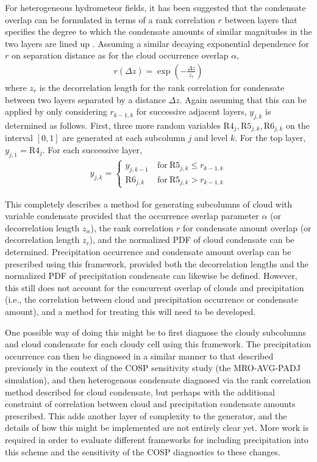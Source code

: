 \documentclass[letter]{article}
\begin{document}
For heterogeneous hydrometeor fields, it has been suggested that the condensate overlap can be formulated in terms of a rank correlation $r$ between layers that specifies the degree to which the condensate amounts of similar magnitudes in the two layers are lined up \citep[e.g.,][]{raisanen_et_al_2004,pincus_et_al_2005}. Assuming a similar decaying exponential dependence for $r$ on separation distance as for the cloud occurrence overlap $\alpha$,
\begin{gather}
    r(\Delta z) = \exp\left(-\frac{\Delta z}{z_r}\right)
    \label{r_z}
\end{gather}
where $z_r$ is the decorrelation length for the rank correlation for condensate between two layers separated by a distance $\Delta z$. Again assuming that this can be applied by only considering $r_{k-1,k}$ for successive adjacent layers, $y_{j,k}$ is determined as follows. First, three more random variables $\text{R4}_{j},\text{R5}_{j,k},\text{R6}_{j,k}$ on the interval $[0,1]$ are generated at each subcolumn $j$ and level $k$. For the top layer, $y_{j,1} = \text{R4}_{j}$. For each successive layer,
\begin{gather}
    y_{j,k} = \begin{cases}
        y_{j,k-1} & ~\text{for}~\text{R5}_{j,k} \le r_{k-1,k} \\
        \text{R6}_{j,k} & ~\text{for}~\text{R5}_{j,k} > r_{k-1,k}
    \end{cases}
\end{gather}

This completely describes a method for generating subcolumns of cloud with variable condensate provided that the occurrence overlap parameter $\alpha$ (or decorrelation length $z_{\alpha}$), the rank correlation $r$ for condensate amount overlap (or decorrelation length $z_{r}$), and the normalized PDF of cloud condensate can be determined. Precipitation occurrence and condensate amount overlap can be prescribed using this framework, provided both the decorrelation lengths and the normalized PDF of precipitation condensate can likewise be defined. However, this still does not account for the concurrent overlap of clouds and precipitation (i.e., the correlation between cloud and precipitation occurrence or condensate amount), and a method for treating this will need to be developed. 

One possible way of doing this might be to first diagnose the cloudy subcolumns and cloud condensate for each cloudy cell using this framework. The precipitation occurrence can then be diagnosed in a similar manner to that described previously in the context of the COSP sensitivity study (the MRO-AVG-PADJ simulation), and then heterogenous condensate diagnosed via the rank correlation method described for cloud condensate, but perhaps with the additional constraint of correlation between cloud and precipitation condensate amounts prescribed. This adds another layer of complexity to the generator, and the details of how this might be implemented are not entirely clear yet. More work is required in order to evaluate different frameworks for including precipitation into this scheme and the sensitivity of the COSP diagnostics to these changes.
\end{document}
